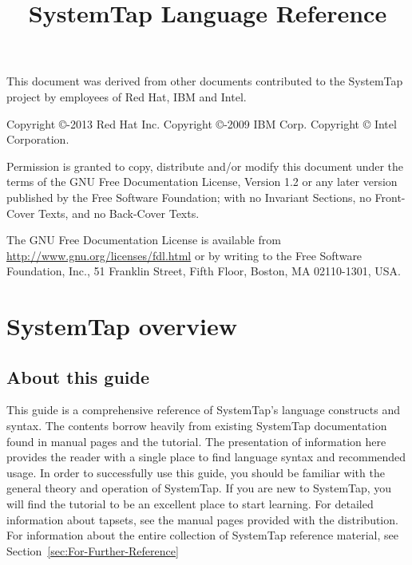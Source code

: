 \documentclass[twoside,english]{article}
\begin{document}
\title{SystemTap Language Reference}

\maketitle
\newpage{}
This document was derived from other documents contributed to the SystemTap project by employees of Red Hat, IBM and Intel.\newline

Copyright \copyright{}-2013 Red Hat Inc.\newline
Copyright \copyright{}-2009 IBM Corp.\newline
Copyright \copyright{} Intel Corporation.\newline

Permission is granted to copy, distribute and/or modify this document
under the terms of the GNU Free Documentation License, Version 1.2
or any later version published by the Free Software Foundation;
with no Invariant Sections, no Front-Cover Texts, and no Back-Cover Texts.\newline

The GNU Free Documentation License is available from
\url{http://www.gnu.org/licenses/fdl.html} or by writing to
the Free Software Foundation, Inc., 51 Franklin Street,
Fifth Floor, Boston, MA 02110-1301, USA.
\newpage{}
\tableofcontents{}
\newpage{}

\section{SystemTap overview\label{sec:SystemTap-Overview}}

\subsection{About this guide}

This guide is a comprehensive reference of SystemTap's language constructs
and syntax. The contents borrow heavily from existing SystemTap documentation
found in manual pages and the tutorial. The presentation of information here
provides the reader with a single place to find language syntax and recommended
usage. In order to successfully use this guide, you should be familiar with
the general theory and operation of SystemTap. If you are new to SystemTap,
you will find the tutorial to be an excellent place to start learning. For
detailed information about tapsets, see the manual pages provided with the
distribution. For information about the entire collection of SystemTap reference
material, see Section~\ref{sec:For-Further-Reference}
\end{document}
